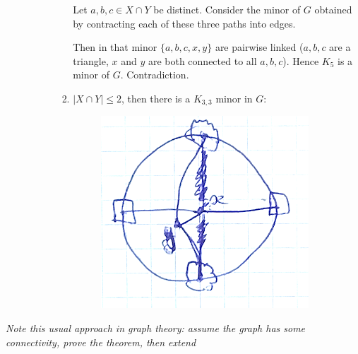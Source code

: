 \begin{enumerate}
\begin{enumerate}
\begin{enumerate}
\begin{enumerate}
Let $a,b,c \in X \cap Y$ be distinct. Consider the minor of $G$ obtained by contracting each of these three paths into edges.
			
			Then in that minor $\{ a,b,c,x,y \}$ are pairwise linked ($a,b,c$ are a triangle, $x$ and $y$ are both connected to all $a,b,c$). Hence $K_5$ is a minor of $G$. Contradiction.
									


									\item $|X \cap Y| \leq 2$, then there is a $K_{3,3}$ minor in $G$: 
									\begin{figure}[h]
	\center
	\includegraphics[width=0.3\linewidth]{img/4-4.png}
\end{figure}
								\end{enumerate}
						\end{enumerate} 
				\end{enumerate}
		\end{enumerate}
		
		\textit{Note this usual approach in graph theory: assume the graph has some connectivity, prove the theorem, then extend}
		
